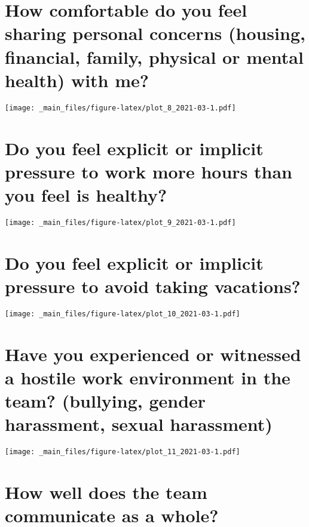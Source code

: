\documentclass[
]{book}
\begin{document}
\hypertarget{how-comfortable-do-you-feel-sharing-personal-concerns-housing-financial-family-physical-or-mental-health-with-me-1}{%
\section{How comfortable do you feel sharing personal concerns (housing, financial, family, physical or mental health) with me?}\label{how-comfortable-do-you-feel-sharing-personal-concerns-housing-financial-family-physical-or-mental-health-with-me-1}}

\texttt{[image: \_main\_files/figure-latex/plot\_8\_2021-03-1.pdf]}

\hypertarget{do-you-feel-explicit-or-implicit-pressure-to-work-more-hours-than-you-feel-is-healthy-1}{%
\section{Do you feel explicit or implicit pressure to work more hours than you feel is healthy?}\label{do-you-feel-explicit-or-implicit-pressure-to-work-more-hours-than-you-feel-is-healthy-1}}

\texttt{[image: \_main\_files/figure-latex/plot\_9\_2021-03-1.pdf]}

\hypertarget{do-you-feel-explicit-or-implicit-pressure-to-avoid-taking-vacations-1}{%
\section{Do you feel explicit or implicit pressure to avoid taking vacations?}\label{do-you-feel-explicit-or-implicit-pressure-to-avoid-taking-vacations-1}}

\texttt{[image: \_main\_files/figure-latex/plot\_10\_2021-03-1.pdf]}

\hypertarget{have-you-experienced-or-witnessed-a-hostile-work-environment-in-the-team-bullying-gender-harassment-sexual-harassment-1}{%
\section{Have you experienced or witnessed a hostile work environment in the team? (bullying, gender harassment, sexual harassment)}\label{have-you-experienced-or-witnessed-a-hostile-work-environment-in-the-team-bullying-gender-harassment-sexual-harassment-1}}

\texttt{[image: \_main\_files/figure-latex/plot\_11\_2021-03-1.pdf]}

\hypertarget{how-well-does-the-team-communicate-as-a-whole-1}{%
\section{How well does the team communicate as a whole?}\label{how-well-does-the-team-communicate-as-a-whole-1}}
\end{document}
